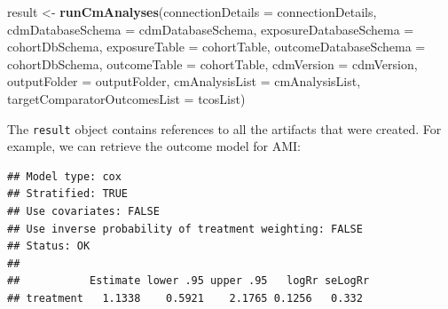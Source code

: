 \documentclass[11pt]{book}
\newenvironment{Shaded}{\begin{snugshade}}{\end{snugshade}}
\newcommand{\DataTypeTok}[1]{\textcolor[rgb]{0.13,0.29,0.53}{#1}}
\newcommand{\DecValTok}[1]{\textcolor[rgb]{0.00,0.00,0.81}{#1}}
\newcommand{\KeywordTok}[1]{\textcolor[rgb]{0.13,0.29,0.53}{\textbf{#1}}}
\newcommand{\NormalTok}[1]{#1}
\newcommand{\OperatorTok}[1]{\textcolor[rgb]{0.81,0.36,0.00}{\textbf{#1}}}
\newcommand{\StringTok}[1]{\textcolor[rgb]{0.31,0.60,0.02}{#1}}
\theoremstyle{definition}
\theoremstyle{definition}
\theoremstyle{definition}
\theoremstyle{remark}
\begin{document}
\begin{Shaded}
\begin{Highlighting}[]
\NormalTok{result <-}\StringTok{ }\KeywordTok{runCmAnalyses}\NormalTok{(}\DataTypeTok{connectionDetails =}\NormalTok{ connectionDetails,}
                        \DataTypeTok{cdmDatabaseSchema =}\NormalTok{ cdmDatabaseSchema,}
                        \DataTypeTok{exposureDatabaseSchema =}\NormalTok{ cohortDbSchema,}
                        \DataTypeTok{exposureTable =}\NormalTok{ cohortTable,}
                        \DataTypeTok{outcomeDatabaseSchema =}\NormalTok{ cohortDbSchema,}
                        \DataTypeTok{outcomeTable =}\NormalTok{ cohortTable,}
                        \DataTypeTok{cdmVersion =}\NormalTok{ cdmVersion,}
                        \DataTypeTok{outputFolder =}\NormalTok{ outputFolder,}
                        \DataTypeTok{cmAnalysisList =}\NormalTok{ cmAnalysisList,}
                        \DataTypeTok{targetComparatorOutcomesList =}\NormalTok{ tcosList)}
\end{Highlighting}
\end{Shaded}

The \texttt{result} object contains references to all the artifacts that were created. For example, we can retrieve the outcome model for AMI:

\begin{Shaded}
\end{Shaded}

\begin{verbatim}
## Model type: cox
## Stratified: TRUE
## Use covariates: FALSE
## Use inverse probability of treatment weighting: FALSE
## Status: OK
## 
##           Estimate lower .95 upper .95   logRr seLogRr
## treatment   1.1338    0.5921    2.1765 0.1256   0.332
\end{verbatim}
\end{document}
